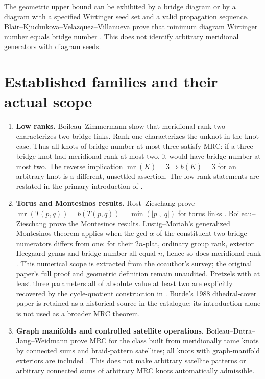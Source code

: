 \documentclass[11pt]{article}
\newcommand{\mr}{\operatorname{mr}}
\begin{document}
The geometric upper bound can be exhibited by a bridge diagram or by a
diagram with a specified Wirtinger seed set and a valid propagation
sequence. Blair--Kjuchukova--Velazquez--Villanueva prove that minimum
diagram Wirtinger number equals bridge number \cite{wirt}. This does not
identify arbitrary meridional generators with diagram seeds.

\section{Established families and their actual scope}

\begin{enumerate}
\item \textbf{Low ranks.} Boileau--Zimmermann show that meridional rank two
characterizes two-bridge links. Rank one characterizes the unknot in the
knot case. Thus all knots of bridge number at most three satisfy MRC:
if a three-bridge knot had meridional rank at most two, it would have
bridge number at most two. The reverse implication
$\mr(K)=3\Rightarrow b(K)=3$ for an arbitrary knot is a different,
unsettled assertion. The low-rank statements are restated in the primary
introduction of \cite{bjw}.

\item \textbf{Torus and Montesinos results.} Rost--Zieschang prove
$\mr(T(p,q))=b(T(p,q))=\min(|p|,|q|)$ for torus links \cite{rz}.
Boileau--Zieschang prove the Montesinos results. Lustig--Moriah's
generalized Montesinos theorem applies when the gcd $\alpha$ of the
constituent two-bridge numerators differs from one: for their $2n$-plat,
ordinary group rank, exterior Heegaard genus and bridge number all
equal $n$, hence so does meridional rank \cite{moriah}.
This numerical scope is extracted from the coauthor's survey; the
original paper's full proof and geometric definition remain unaudited.
Pretzels with at least three parameters all of absolute value
at least two are explicitly recovered by the cycle-quotient construction
in \cite{bbk}. Burde's 1988 dihedral-cover paper is retained as a historical
source in the catalogue; its introduction alone is not used as a broader
MRC theorem.

\item \textbf{Graph manifolds and controlled satellite operations.}
Boileau--Dutra--Jang--Weidmann prove MRC for the class built from
meridionally tame knots by connected sums and braid-pattern satellites;
all knots with graph-manifold exteriors are included \cite{bdjw}.
This does not make arbitrary satellite patterns or arbitrary connected
sums of arbitrary MRC knots automatically admissible.


\end{enumerate}
\end{document}
